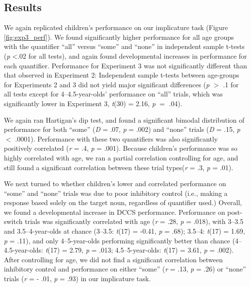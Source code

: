 \documentclass[man]{apa2}
\begin{document}
\subsection{Results}

We again replicated children's performance on our implicature task (Figure \ref{fig:exp3_perf}). We found significantly higher performance for all age groups with the quantifier ``all'' versus ``some'' and ``none'' in independent sample t-tests (\emph{p} \textless .02 for all tests), and again found developmental increases in performance for each quantifier. Performance for Experiment 3 was not significantly different than that observed in Experiment 2: Independent sample t-tests between age-groups for Experiments 2 and 3 did not yield major significant differences (\emph{p} $>$ .1 for all tests except for 4--4.5-year-olds' performance on ``all'' trials, which was significantly lower in Experiment 3, \emph{t}(30) = 2.16, \emph{p} $=$ .04).

We again ran Hartigan's dip test, and found a significant bimodal distribution of performance for both ``some'' (\textit{D} = .07, \textit{p} = .002) and ``none'' trials (\textit{D} = .15, \textit{p} $<$ .0001). Performance with these two quantifiers was also significantly positively correlated (\emph{r} = .4, \emph{p} = .001). Because children's performance was so highly correlated with age, we ran a partial correlation controlling for age, and still found a significant correlation between these trial types(\emph{r} = .3, \emph{p} = .01).

We next turned to whether children's lower and correlated performance on ``some'' and ``none'' trials was due to poor inhibitory control (i.e., making a response based solely on the target noun, regardless of quantifier used.) Overall, we found a developmental increase in DCCS performance. Performance on post-switch trials was significantly correlated with age (\textit{r} = .28, \textit{p} = .018), with 3--3.5 and 3.5--4-year-olds at chance (3--3.5: \emph{t}(17) = -0.41, \emph{p} = .68); 3.5--4: \emph{t}(17) = 1.69, \emph{p} = .11), and only 4--5-year-olds performing significantly better than chance (4--4.5-year-olds: \emph{t}(17) = 2.79, \emph{p} = .013; 4.5--5-year-olds: \emph{t}(17) = 3.61, \emph{p} = .002). After controlling for age, we did not find a significant correlation between inhibitory control and performance on either ``some'' (\textit{r} = .13, \textit{p} = .26) or ``none'' trials (\textit{r} = - .01, \textit{p} = .93) in our implicature task.
\end{document}
